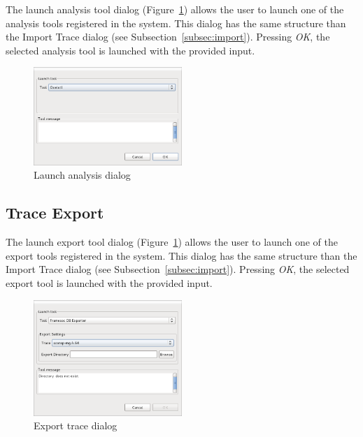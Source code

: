 \documentclass[twoside]{article}
\begin{document}
\begin{sloppypar}
The launch analysis tool dialog (Figure~\ref{fig:analysis_dialog}) allows the user to launch one of the analysis tools registered in the system.
This dialog has the same structure than the Import Trace dialog (see Subsection~\ref{subsec:import}). 
Pressing \emph{OK}, the selected analysis tool is launched with the provided input. 

\begin{figure}[h!]
  \centering
    \includegraphics[width=0.5\textwidth]{images/analysis_dialog.png}
  \caption{Launch analysis dialog}
  \label{fig:analysis_dialog}
\end{figure}

\subsection{Trace Export }
\label{subsec:export}

The launch export tool dialog (Figure~\ref{fig:analysis_dialog}) allows the user to launch one of the export tools registered in the system.
This dialog has the same structure than the Import Trace dialog (see Subsection~\ref{subsec:import}). 
Pressing \emph{OK}, the selected export tool is launched with the provided input. 

\begin{figure}[h!]
  \centering
    \includegraphics[width=0.5\textwidth]{images/export_dialog.png}
  \caption{Export trace dialog}
  \label{fig:export_dialog}
\end{figure}

\newpage


\end{sloppypar}
\end{document}
